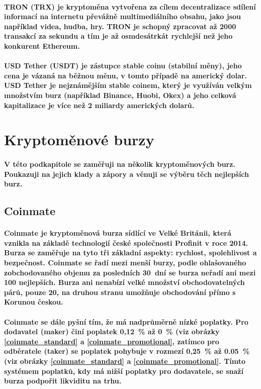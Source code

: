\documentclass[thesis=B,czech]{FITthesis}[2019/03/21]
\begin{document}
\paragraph{
TRON (TRX) je kryptoměna vytvořena za cílem decentralizace sdílení informací na internetu převážně multimediálního obsahu, jako jsou například videa, hudba, hry. TRON je schopný zpracovat až 2000 transakcí za sekundu a tím je až osmdesátrkát rychlejší než jeho konkurent Ethereum. \cite{finex_trx}
}
\paragraph{
USD Tether (USDT) je zástupce stable coinu (stabilní měny), jeho cena je vázaná na běžnou měnu, v tomto případě na americký dolar. USD Tether je nejznámějším stable coinem, který je využíván velkým množstvím burz (například Binance, Huobi, Okex) a jeho celková kapitalizace je více než 2 miliardy amerických dolarů. \cite{mlady_investor_stable_coin} 
}
\section{Kryptoměnové burzy}
\paragraph{
V této podkapitole se zaměřuji na několik kryptoměnových burz. Poukazuji na jejich klady a zápory a věnuji se výběru těch nejlepších burz.
}
\subsection{Coinmate}
\paragraph{
Coinmate je kryptoměnová burza sídlící ve Velké Británii, která vznikla na základě technologií české společnosti Profinit v roce 2014. Burza se zaměřuje na tyto tři základní aspekty: rychlost, spolehlivost a bezpečnost. Coinmate se řadí mezi menší burzy, podle ohlašovaného zobchodovaného objemu za posledních 30~dní se burza neřadí ani mezi 100 nejlepších. \cite{coinmarketcap} Burza ani nenabízí velké množství obchodovatelných párů, pouze 20, na druhou stranu umožňuje obchodování přímo s Korunou českou. 
}
\paragraph{
Coinmate se dále pyšní tím, že má nadprůměrně nízké poplatky. Pro dodavatel (maker) činí poplatek 0,12~\% až 0~\% (viz obrázky \ref{coinmate_standard} a \ref{coinmate_promotional}, zatímco pro odběratele (taker) se poplatek pohybuje v rozmezí 0,25~\% až 0.05~\% (viz obrázky \ref{coinmate_standard} a \ref{coinmate_promotional}. Tímto systémem poplatků, kdy má nižší poplatky pro dodavatele, se snaží burza podpořit likviditu na trhu. \cite{cryptowisser_coinmate} \cite{coinmate_fees}
}
\end{document}
